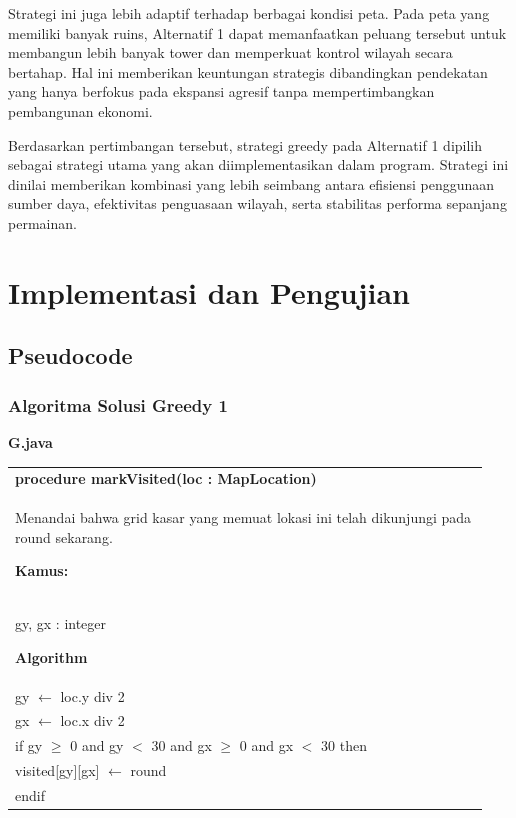 \documentclass{article}
\newenvironment{pseudobox}
{
\centering
\begin{longtable}{|p{0.94\linewidth}|}
\hline
}
{
\\ \hline
\end{longtable}
\vspace{0.05cm}
}
\begin{document}
Strategi ini juga lebih adaptif terhadap berbagai kondisi peta. Pada peta yang memiliki banyak ruins, 
Alternatif 1 dapat memanfaatkan peluang tersebut untuk membangun lebih banyak tower dan 
memperkuat kontrol wilayah secara bertahap. Hal ini memberikan keuntungan strategis dibandingkan 
pendekatan yang hanya berfokus pada ekspansi agresif tanpa mempertimbangkan pembangunan ekonomi.

Berdasarkan pertimbangan tersebut, strategi greedy pada Alternatif 1 dipilih sebagai strategi utama yang 
akan diimplementasikan dalam program. Strategi ini dinilai memberikan kombinasi yang lebih seimbang 
antara efisiensi penggunaan sumber daya, efektivitas penguasaan wilayah, serta stabilitas performa 
sepanjang permainan.

\newpage
\section{Implementasi dan Pengujian}

\subsection{Pseudocode}

\subsubsection{Algoritma Solusi Greedy 1}
\item \textbf{G.java}

\begin{pseudobox}
\textbf{procedure markVisited(loc : MapLocation)} \\
{ Menandai bahwa grid kasar yang memuat lokasi ini telah dikunjungi pada round sekarang. }

\textbf{Kamus:} \\
\hspace*{1em} gy, gx : integer

\textbf{Algorithm} \\
\hspace*{1em} gy $\leftarrow$ loc.y div 2 \\
\hspace*{1em} gx $\leftarrow$ loc.x div 2 \\

\hspace*{1em} if gy $\geq$ 0 and gy $<$ 30 and gx $\geq$ 0 and gx $<$ 30 then \\
\hspace*{2em} visited[gy][gx] $\leftarrow$ round \\
\hspace*{1em} endif
\end{pseudobox}
\end{document}
